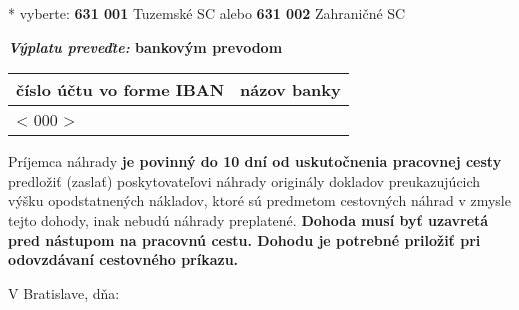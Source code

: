 \documentclass[10pt,a4paper]{article}
\newcommand{\placeholder}[1]{< #1 >}
\newcommand{\iban}{\placeholder{000}}
\begin{document}
* vyberte: \textbf{631 001} Tuzemské SC alebo \textbf{631 002} Zahraničné SC

\textbf{\textit{Výplatu preveďte:} bankovým prevodom}

\vspace*{-0.5em}
\begin{table}[h!]
\centering
\begin{tabularx}{\linewidth}{|X|X|}
	\hline
	\textbf{číslo účtu vo forme IBAN} & \textbf{názov banky} \\ \hline
	\iban & \\ \hline
\end{tabularx}
\end{table}
\vspace*{-0.5em}

Príjemca náhrady \textbf{je povinný do 10 dní od uskutočnenia pracovnej cesty} predložiť (zaslať) poskytovateľovi náhrady originály dokladov preukazujúcich výšku opodstatnených nákladov, ktoré sú predmetom cestovných náhrad v zmysle tejto dohody, inak nebudú náhrady preplatené. \textbf{Dohoda musí byť uzavretá pred nástupom na pracovnú cestu. Dohodu je potrebné priložiť pri odovzdávaní cestovného príkazu.}

\vspace*{1em}

V Bratislave, dňa:

\vspace*{4em}

\par\noindent\makebox[4cm]{\hrulefill} \hspace{6cm} \makebox[4cm]{\hrulefill}
\par\noindent{} \hspace{6cm} 
\end{document}

